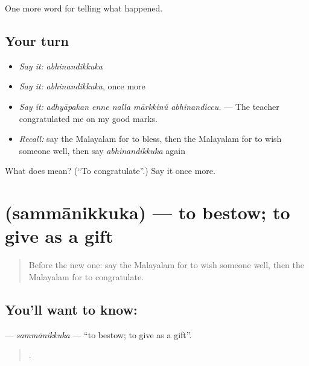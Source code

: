 \begin{grammarlens}[title={What you've built}]
One more word for telling what happened.
\end{grammarlens}

\subsection*{Your turn}
\begin{itemize}
\raggedright
  \item \emph{Say it:} \emph{abhinandikkuka}
  \item \emph{Say it:} \emph{abhinandikkuka}, once more
  \item \emph{Say it:} \emph{adhyāpakan enne nalla mārkkinŭ abhinandiccu.} — The teacher congratulated me on my good marks.
  \item \emph{Recall:} say the Malayalam for to bless, then the Malayalam for to wish someone well, then say \emph{abhinandikkuka} again
\end{itemize}

\begin{tcolorbox}[breakable,colback=teal!4,colframe=teal!35!black,title={Before you move on}]
What does  mean? (\textquotedblleft{}To congratulate\textquotedblright{}.) Say it once more.
\end{tcolorbox}
\section[\texorpdfstring{\ml{സമ്മാനിക്കുക} (sammānikkuka)}{സമ്മാനിക്കുക (sammānikkuka)}]{ (sammānikkuka) — to bestow; to give as a gift}

\label{lesson:ML-C388-sammanikkuka}



\begin{quote}
Before the new one: say the Malayalam for to wish someone well, then the Malayalam for to congratulate.
\end{quote}

\subsection*{You'll want to know: }
\textbf{} — \emph{sammānikkuka} — \textquotedblleft{}to bestow; to give as a gift\textquotedblright{}.

\begin{quote}
    .
\end{quote}

